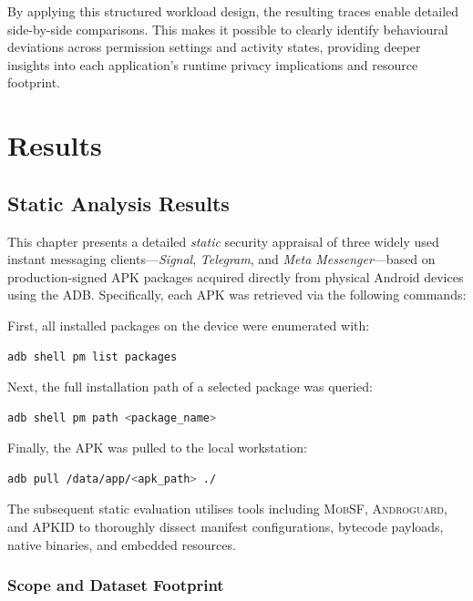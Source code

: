 \documentclass[a4paper,12pt]{report}
\begin{document}
By applying this structured workload design, the resulting traces enable detailed side-by-side comparisons. This makes it possible to clearly identify behavioural deviations across permission settings and activity states, providing deeper insights into each application's runtime privacy implications and resource footprint.


\chapter{Results}

\section{Static Analysis Results}

This chapter presents a detailed \emph{static} security appraisal of three widely used instant messaging clients—\textit{Signal}, \textit{Telegram}, and \textit{Meta Messenger}—based on production-signed APK packages acquired directly from physical Android devices using the ADB. Specifically, each APK was retrieved via the following commands:

First, all installed packages on the device were enumerated with:
\begin{lstlisting}[language=bash]
adb shell pm list packages
\end{lstlisting}

Next, the full installation path of a selected package was queried:
\begin{lstlisting}[language=bash]
adb shell pm path <package_name>
\end{lstlisting}

Finally, the APK was pulled to the local workstation:
\begin{lstlisting}[language=bash]
adb pull /data/app/<apk_path> ./
\end{lstlisting}

The subsequent static evaluation utilises tools including \textsc{MobSF}, \textsc{Androguard}, and \textsc{APKID} to thoroughly dissect manifest configurations, bytecode payloads, native binaries, and embedded resources.

\subsection{Scope and Dataset Footprint}
\end{document}
